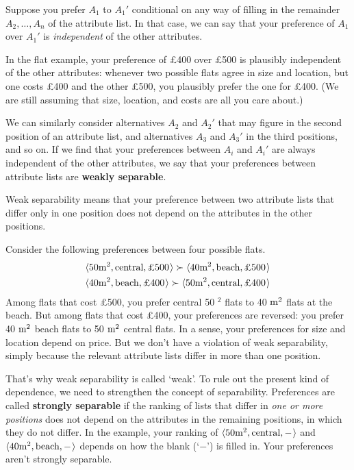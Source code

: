 Suppose you prefer $A_{1}$ to $A_{1}'$ conditional on any way of filling in the
remainder $A_{2},\ldots,A_{n}$ of the attribute list. In that case, we can say
that your preference of $A_{1}$ over $A_{1}'$ is \emph{independent} of the other
attributes.

In the flat example, your preference of £400 over £500 is plausibly independent
of the other attributes: whenever two possible flats agree in size and location,
but one costs £400 and the other £500, you plausibly prefer the one for £400.
(We are still assuming that size, location, and costs are all you care about.)

We can similarly consider alternatives $A_{2}$ and $A_{2}'$ that may figure in
the second position of an attribute list, and alternatives $A_{3}$ and $A_{3}'$
in the third positions, and so on. If we find that your preferences between
$A_{i}$ and $A_{i}'$ are always independent of the other attributes, we say that
your preferences between attribute lists are \textbf{weakly separable}.

Weak separability means that your preference between two attribute lists that
differ only in one position does not depend on the attributes in the other
positions.

Consider the following preferences between four possible flats.
\begin{gather*}
\t{50 \m^2, \text{central}, \text{£500}} \succ \t{40 \m^2, \text{beach}, \text{£500}}\\
\t{40 \m^2, \text{beach}, \text{£400}} \succ \t{50 \m^2, \text{central}, \text{£400}}
\end{gather*}
Among flats that cost £500, you prefer central 50 \m$^2$ flats to 40 $\text{m}^2$
flats at the beach. But among flats that cost £400, your preferences are
reversed: you prefer 40 $\text{m}^2$ beach flats to 50 $\text{m}^2$ central flats. In a
sense, your preferences for size and location depend on price. But we don't have
a violation of weak separability, simply because the relevant attribute lists
differ in more than one position.

That's why weak separability is called `weak'. To rule out the present kind of
dependence, we need to strengthen the concept of separability. Preferences are
called \textbf{strongly separable} if the ranking of lists that differ in
\emph{one or more positions} does not depend on the attributes in the remaining
positions, in which they do not differ. In the example, your ranking of
$\t{50 \m^2, \text{central}, -}$ and $\t{40 \m^2, \text{beach}, -}$ depends on
how the blank (`$-$') is filled in. Your preferences aren't strongly separable.

